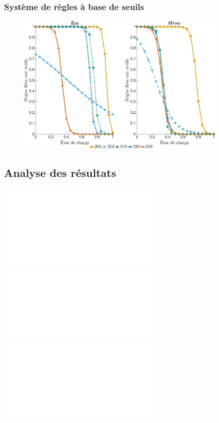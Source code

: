 \documentclass[french]{beamer}
\begin{document}
{\begin{frame}
\frametitle{Système de règles à base de seuils} 
\begin{figure}
\begin{center}
\includegraphics[width=0.9\textwidth]{figtbrFr3.pdf}
\end{center}
\end{figure}
\end{frame}
% 

% 
% 
% 

\subsection{Analyse des résultats}
% 


\begin{frame}
\begin{center}
\begin{overlayarea}{\linewidth}{2.8in}
\includegraphics<1 | handout:0>[width=\linewidth]{figResAnalysis01.pdf}
\includegraphics<2 | handout:0>[width=\linewidth]{figResAnalysis02.pdf}
\includegraphics<3>[width=\linewidth]{figResAnalysis03.pdf}
\end{overlayarea}
\end{center}
\end{frame}



}
\end{document}
